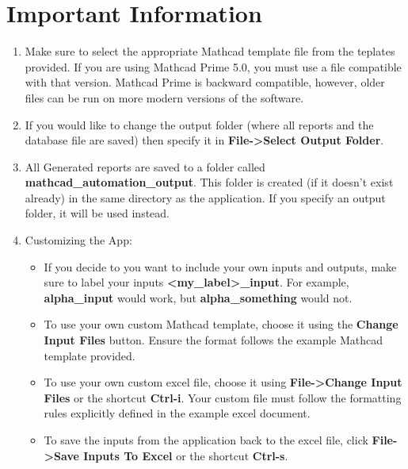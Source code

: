 \documentclass[11pt]{article}
\begin{document}
\section{Important Information}
\label{sec:orgb2a6920}
\begin{enumerate}
\item Make sure to select the appropriate Mathcad template file from the teplates provided. If you are using Mathcad Prime 5.0, you must use a file compatible with that version. Mathcad Prime is backward compatible, however, older files can be run on more modern versions of the software.
\item If you would like to change the output folder (where all reports and the database file are saved) then specify it in \textbf{File->Select Output Folder}.
\item All Generated reports are saved to a folder called \textbf{mathcad\_automation\_output}. This folder is created (if it doesn't exist already) in the same directory as the application. If you specify an output folder, it will be used instead.
\item Customizing the App:
\begin{itemize}
\item If you decide to you want to include your own inputs and outputs, make sure to label your inputs \textbf{<my\_label>\_input}. For example, \textbf{alpha\_input} would work, but \textbf{alpha\_something} would not.
\item To use your own custom Mathcad template, choose it using the \textbf{Change Input Files} button. Ensure the format follows the example Mathcad template provided.
\item To use your own custom excel file, choose it using \textbf{File->Change Input Files} or the shortcut \textbf{Ctrl-i}. Your custom file must follow the formatting rules explicitly defined in the example excel document.
\item To save the inputs from the application back to the excel file, click \textbf{File->Save Inputs To Excel} or the shortcut \textbf{Ctrl-s}.
\end{itemize}
\end{enumerate}
\end{document}
